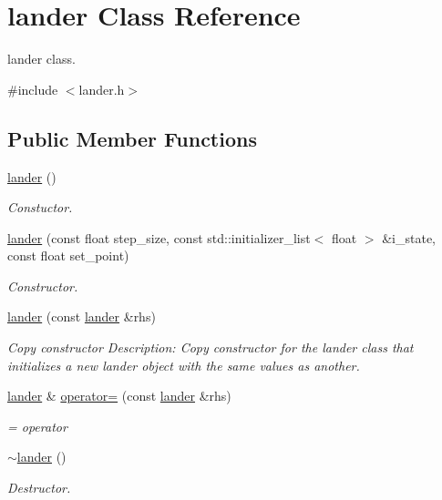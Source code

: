 \hypertarget{classlander}{}\section{lander Class Reference}
\label{classlander}


lander class.  




{\ttfamily \#include $<$lander.\+h$>$}

\subsection*{Public Member Functions}
\begin{DoxyCompactItemize}
\item 
\hyperlink{classlander_ad90447438348cd18fc11a1e5c535bcc7}{lander} ()
\begin{DoxyCompactList}\small\item\em Constuctor. \end{DoxyCompactList}\item 
\hyperlink{classlander_afcc7deebd2ae6ce4391d6a29194ee42f}{lander} (const float step\+\_\+size, const std\+::initializer\+\_\+list$<$ float $>$ \&i\+\_\+state, const float set\+\_\+point)
\begin{DoxyCompactList}\small\item\em Constructor. \end{DoxyCompactList}\item 
\hyperlink{classlander_ab73cd2ea79597ebde27baf217c507f58}{lander} (const \hyperlink{classlander}{lander} \&rhs)
\begin{DoxyCompactList}\small\item\em Copy constructor Description\+: Copy constructor for the lander class that initializes a new lander object with the same values as another. \end{DoxyCompactList}\item 
\hyperlink{classlander}{lander} \& \hyperlink{classlander_af3b77c442d0872e00520a66f771cc477}{operator=} (const \hyperlink{classlander}{lander} \&rhs)
\begin{DoxyCompactList}\small\item\em = operator \end{DoxyCompactList}\item 
\hyperlink{classlander_abadffd59954f62978cee21bc59e22cfa}{$\sim$lander} ()
\begin{DoxyCompactList}\small\item\em Destructor. \end{DoxyCompactList}\item 

\end{DoxyCompactItemize}
